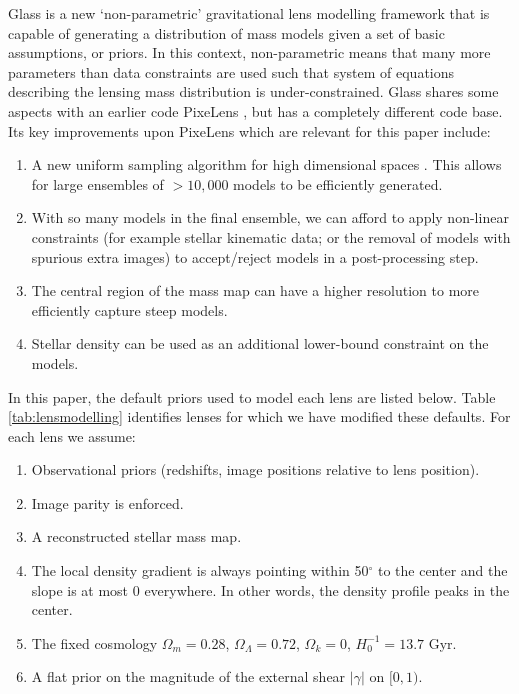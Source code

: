 \documentclass[useAMS,usenatbib]{mn2e}
\def\Glass{{\sc Glass}}
\def\PixeLens{{\sc PixeLens}}
\begin{document}
\Glass{} is a new `non-parametric' gravitational lens modelling framework
\citep{2014arXiv1401.7990C} that is capable of generating a distribution of
mass models given a set of basic assumptions, or priors.  In this context,
non-parametric means that  many more parameters than data constraints are used
such that system of equations describing the lensing mass distribution is
under-constrained.  \Glass{} shares some aspects with an earlier code
\PixeLens{} \citep{2004AJ....127.2604S,2008ApJ...679...17C}, but has a completely
different code base. Its key improvements upon \PixeLens{} which are relevant
for this paper include:

\begin{enumerate}
\item A new uniform sampling algorithm for high
    dimensional spaces \citep{2012MNRAS.425.3077L}. This allows for large
    ensembles of $>10,000$ models to be efficiently generated. 
\item With so many models in the final ensemble, we can afford to apply
    non-linear constraints (for example stellar kinematic data; or the removal of
    models with spurious extra images) to accept/reject models in a post-processing
    step.
\item The central region of the mass map can have a higher resolution to more
    efficiently capture steep models.
\item Stellar density can be used as an additional lower-bound constraint on the models. 
\end{enumerate} 

In this paper, the default priors used to model each lens are listed below.  Table
\ref{tab:lensmodelling} identifies lenses for which we have modified these defaults.
For each lens we assume:

\begin{enumerate} 
\item Observational priors (redshifts, image positions relative to lens position).
\item Image parity is enforced.
\item A reconstructed stellar mass map.
\item The local density gradient is always pointing within 50$^{\circ}$ to the center and the slope is at most 0 everywhere. In other words, the density profile peaks in the center.
\item The fixed cosmology $\Omega_{m} = 0.28$, $\Omega_{\Lambda} = 0.72$, $\Omega_{k} = 0$, $H_{0}^{-1} = 13.7$ Gyr.
\item A flat prior on the magnitude of the external shear $|\gamma|$ on $[0,1)$.
\end{enumerate}
\end{document}
